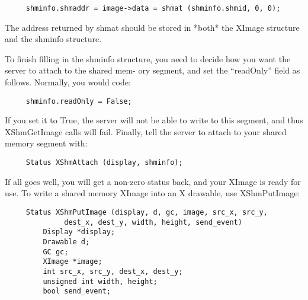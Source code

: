 \documentclass{article}
\begin{document}
\begin{verbatim}
     shminfo.shmaddr = image->data = shmat (shminfo.shmid, 0, 0);
\end{verbatim}

The address returned by shmat should be stored in *both* the
XImage structure and the shminfo structure.

To finish filling in the shminfo structure, you need to
decide how you want the server to attach to the shared mem-
ory segment, and set the ``readOnly'' field as follows.
Normally, you would code:

\begin{verbatim}
     shminfo.readOnly = False;
\end{verbatim}

If you set it to True, the server will not be able to write
to this segment, and thus XShmGetImage calls will fail.
Finally, tell the server to attach to your shared memory
segment with:

\begin{verbatim}
     Status XShmAttach (display, shminfo);
\end{verbatim}

If all goes well, you will get a non-zero status back, and
your XImage is ready for use.
To write a shared memory XImage into an X drawable, use
XShmPutImage:

\begin{verbatim}
     Status XShmPutImage (display, d, gc, image, src_x, src_y,
			  dest_x, dest_y, width, height, send_event)
	     Display *display;
	     Drawable d;
	     GC gc;
	     XImage *image;
	     int src_x, src_y, dest_x, dest_y;
	     unsigned int width, height;
	     bool send_event;
\end{verbatim}
\end{document}

